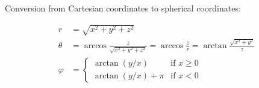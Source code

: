 \documentclass{article}
\begin{document}
Conversion from Cartesian coordinates to spherical coordinates:

\begin{align*}
r &= \sqrt{x^2 + y^2 + z^2} \\
\theta &= \arccos\frac{z}{\sqrt{x^2 + y^2 + z^2}} = \arccos\frac{z}{r}=\arctan\frac{\sqrt{x^2+y^2}}{z} \\
\varphi &=
\begin{cases}
    \operatorname{arctan}(y/x) & \text{if } x \geq 0 \\
    \operatorname{arctan}(y/x) + \pi & \text{if } x < 0
\end{cases}
\end{align*}
\end{document}
